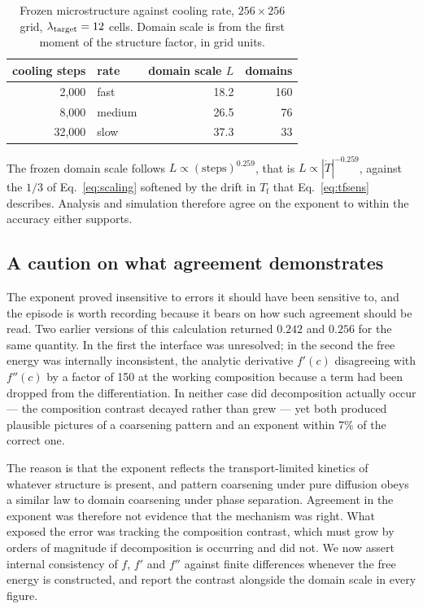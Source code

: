 \documentclass[11pt,a4paper]{article}
\newcommand{\Tf}{T_{\mathrm{f}}}
\begin{document}
\begin{table}[htbp]
\centering
\caption{Frozen microstructure against cooling rate, $256\times256$ grid,
$\lambda_{\rm target} = 12$ cells. Domain scale is from the first moment of the
structure factor, in grid units.}
\label{tab:rates}
\small
\begin{tabular}{rlrr}
\toprule
cooling steps & rate & domain scale $L$ & domains \\
\midrule
 2{,}000 & fast   & 18.2 & 160 \\
 8{,}000 & medium & 26.5 &  76 \\
32{,}000 & slow   & 37.3 &  33 \\
\bottomrule
\end{tabular}
\end{table}

The frozen domain scale follows $L \propto (\text{steps})^{0.259}$, that is
$L \propto |\dot{T}|^{-0.259}$, against the $1/3$ of Eq.~\eqref{eq:scaling}
softened by the drift in $\Tf$ that Eq.~\eqref{eq:tfsens} describes. Analysis
and simulation therefore agree on the exponent to within the accuracy either
supports.

\subsection{A caution on what agreement demonstrates}

The exponent proved insensitive to errors it should have been sensitive to, and
the episode is worth recording because it bears on how such agreement should be
read. Two earlier versions of this calculation returned $0.242$ and $0.256$ for
the same quantity. In the first the interface was unresolved; in the second the
free energy was internally inconsistent, the analytic derivative $f'(c)$
disagreeing with $f''(c)$ by a factor of 150 at the working composition because
a term had been dropped from the differentiation. In neither case did
decomposition actually occur --- the composition contrast decayed rather than
grew --- yet both produced plausible pictures of a coarsening pattern and an
exponent within 7\% of the correct one.

The reason is that the exponent reflects the transport-limited kinetics of
whatever structure is present, and pattern coarsening under pure diffusion obeys
a similar law to domain coarsening under phase separation. Agreement in the
exponent was therefore not evidence that the mechanism was right. What exposed
the error was tracking the composition contrast, which must grow by orders of
magnitude if decomposition is occurring and did not. We now assert internal
consistency of $f$, $f'$ and $f''$ against finite differences whenever the free
energy is constructed, and report the contrast alongside the domain scale in
every figure.
\end{document}
